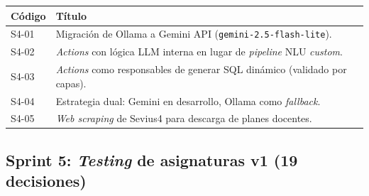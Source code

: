 \begin{longtable}{|p{1.3cm}|>{\raggedright\arraybackslash}p{12cm}|}
\hline
\textbf{Código} & \textbf{Título} \\ \hline
S4-01 & Migración de Ollama a Gemini API (\texttt{gemini-2.5-flash-lite}). \\ \hline
S4-02 & \textit{Actions} con lógica LLM interna en lugar de \textit{pipeline} NLU \textit{custom}. \\ \hline
S4-03 & \textit{Actions} como responsables de generar SQL dinámico (validado por capas). \\ \hline
S4-04 & Estrategia dual: Gemini en desarrollo, Ollama como \textit{fallback}. \\ \hline
S4-05 & \textit{Web scraping} de Sevius4 para descarga de planes docentes. \\ \hline
\end{longtable}

\subsection*{Sprint 5: \textit{Testing} de asignaturas v1 (19 decisiones)}

